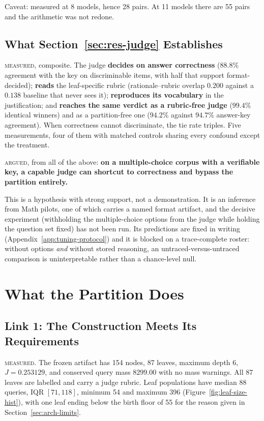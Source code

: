 Caveat: measured at 8 models, hence 28 pairs. At 11 models there are 55
pairs and the arithmetic was not redone.

\subsection{What Section~\ref{sec:res-judge} Establishes}\label{sec:res-judge-summary}

\textsc{measured}, composite. The judge \textbf{decides on answer
correctness} ($88.8\%$ agreement with the key on discriminable items,
with half that support format-decided); \textbf{reads} the
leaf-specific rubric (rationale--rubric overlap $0.200$ against a
$0.138$ baseline that never sees it); \textbf{reproduces its
vocabulary} in the justification; and \textbf{reaches the same verdict
as a rubric-free judge} ($99.4\%$ identical winners) and as a
partition-free one ($94.2\%$ against $94.7\%$ answer-key agreement).
When correctness cannot discriminate, the tie rate triples. Five
measurements, four of them with matched controls sharing every
confound except the treatment.

\textsc{argued}, from all of the above: \textbf{on a multiple-choice
corpus with a verifiable key, a capable judge can shortcut to
correctness and bypass the partition entirely.}

This is a hypothesis with strong support, not a demonstration. It is an
inference from Math pilots, one of which carries a named format
artifact, and the decisive experiment (withholding the
multiple-choice options from the judge while holding the question set
fixed) has not been run. Its predictions are fixed in writing
(Appendix~\ref{app:tuning-protocol}) and it is blocked on a
trace-complete roster: without options \emph{and} without stored
reasoning, an untraced-versus-untraced comparison is uninterpretable
rather than a chance-level null.

\section{What the Partition Does}\label{sec:res-partition}

\subsection{Link 1: The Construction Meets Its Requirements}\label{sec:res-construction}

\textsc{measured.} The frozen artifact has 154 nodes, 87 leaves,
maximum depth 6, $J = 0.253129$, and conserved query mass $8299.00$
with no mass warnings. All 87 leaves are labelled and carry a judge
rubric. Leaf populations have median 88 queries, IQR $[71, 118]$,
minimum 54 and maximum 396 (Figure~\ref{fig:leaf-size-hist}), with one
leaf ending below the birth floor of 55 for the reason given in
Section~\ref{sec:arch-limits}.

